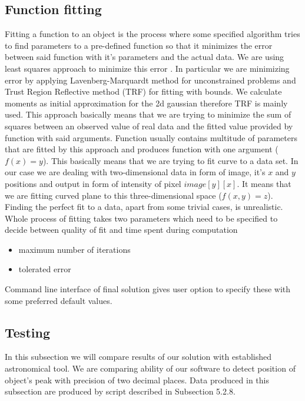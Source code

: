 \documentclass[12pt, a4paper, oneside]{book}
\begin{document}
\subsection{Function fitting}
Fitting a function to an object is the process where some specified algorithm tries to find parameters to a pre-defined function so that it minimizes the error between said function with it's parameters and the actual data.
We are using least squares approach to minimize this error \cite{watson1967}.
In particular we are minimizing error by applying Lavenberg-Marquardt method \cite{lavmar} for unconstrained problems and Trust Region Reflective method \cite{trf} (TRF) for fitting with bounds.
We calculate moments as initial approximation for the 2d gaussian therefore TRF is mainly used.
This approach basically means that we are trying to minimize the sum of squares between an observed value of real data and the fitted value provided by function with said arguments.
Function usually contains multitude of parameters that are fitted by this approach and produces function with one argument ($f(x)=y$).
This basically means that we are trying to fit curve to a data set.
In our case we are dealing with two-dimensional data in form of image, it's $x$ and $y$ positions and output in form of intensity of pixel $image[y][x]$.
It means that we are fitting curved plane to this three-dimensional space ($f(x,y)=z$).
\\
Finding the perfect fit to a data, apart from some trivial cases, is unrealistic.\\
Whole process of fitting takes two parameters which need to be specified to decide between quality of fit and time spent during computation
\begin{itemize}
    \item maximum number of iterations
    \item tolerated error
\end{itemize}

Command line interface of final solution gives user option to specify these with some preferred default values.

\subsection{Testing}

In this subsection we will compare results of our solution with established astronomical tool.
We are comparing ability of our software to detect position of object's peak with precision of two decimal places.
Data produced in this subsection are produced by script described in Subsection 5.2.8.
\end{document}
